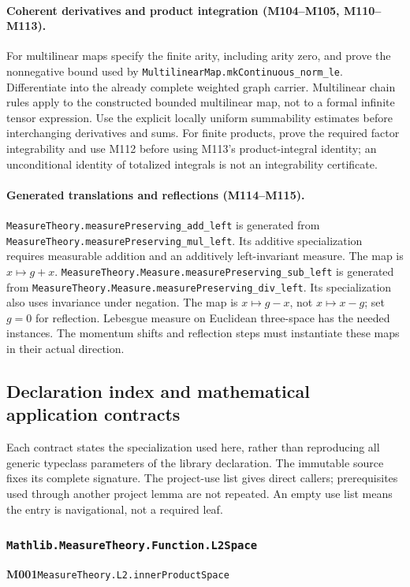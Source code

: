 \documentclass[11pt,a4paper]{article}
\theoremstyle{definition}
\theoremstyle{remark}
\begin{document}
\paragraph{Coherent derivatives and product integration
(M104--M105, M110--M113).}
For multilinear maps specify the finite arity, including arity zero,
and prove the nonnegative bound used by
\nolinkurl{MultilinearMap.mkContinuous_norm_le}. Differentiate into
the already complete weighted graph carrier. Multilinear chain rules
apply to the constructed bounded multilinear map, not to a formal
infinite tensor expression. Use the explicit locally uniform
summability estimates before interchanging derivatives and sums.
For finite products, prove the required factor integrability and
use M112 before using M113's product-integral identity; an
unconditional identity of totalized integrals is not an
integrability certificate.

\paragraph{Generated translations and reflections (M114--M115).}
\nolinkurl{MeasureTheory.measurePreserving_add_left} is generated from
\nolinkurl{MeasureTheory.measurePreserving_mul_left}. Its additive
specialization requires measurable addition and an additively
left-invariant measure. The map is $x\mapsto g+x$.
\nolinkurl{MeasureTheory.Measure.measurePreserving_sub_left} is
generated from
\nolinkurl{MeasureTheory.Measure.measurePreserving_div_left}.
Its specialization also uses invariance under negation. The map is
$x\mapsto g-x$, not $x\mapsto x-g$; set $g=0$ for reflection.
Lebesgue measure on Euclidean three-space has the needed instances.
The momentum shifts and reflection steps must instantiate these
maps in their actual direction.

\subsection{Declaration index and mathematical application contracts}
Each contract states the specialization used here, rather than reproducing
all generic typeclass parameters of the library declaration. The immutable
source fixes its complete signature. The project-use list gives direct
callers; prerequisites used through another project lemma are not repeated.
An empty use list means the entry is navigational, not a required leaf.

\subsubsection*{\nolinkurl{Mathlib.MeasureTheory.Function.L2Space}}
\noindent\textbf{M001}\label{base:M001}\quad\nolinkurl{MeasureTheory.L2.innerProductSpace}
\end{document}
